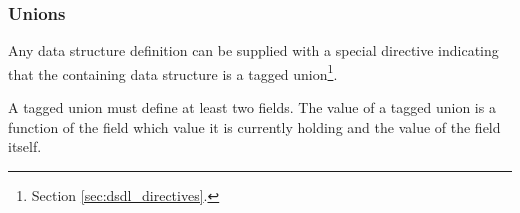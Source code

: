 \subsubsection{Unions}

Any data structure definition can be supplied with a special directive indicating that the containing
data structure is a tagged union\footnote{Section \ref{sec:dsdl_directives}.}.

A tagged union must define at least two fields.
The value of a tagged union is a function of the field which value it is currently holding
and the value of the field itself.
